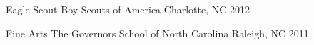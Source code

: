 

\begin{cvhonors}

      \cvhonor
        {Eagle Scout} %
        {Boy Scouts of America} %
        {Charlotte, NC} %
        {2012} %
    
      \cvhonor
        {Fine Arts} %
        {The Governors School of North Carolina} %
        {Raleigh, NC} %
        {2011} %
    
    \end{cvhonors}
    